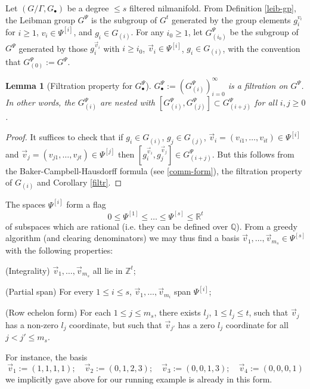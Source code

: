 \documentclass[11pt,reqno]{amsart}
\numberwithin{equation}{section}
\theoremstyle{plain}
\newtheorem{lemma}[subsection]{Lemma}
\theoremstyle{definition}
\renewcommand{\leq}{\leqslant}
\renewcommand{\geq}{\geqslant}
\newcommand\Z{\mathbb{Z}}
\newcommand\R{\mathbb{R}}
\newcommand\Q{\mathbb{Q}}
\newcommand\1{{\bf 1}}
\newcommand\2{{\bf 2}}
\begin{document}
Let $(G/\Gamma, G_\bullet)$ be a degree $\leq s$ filtered nilmanifold.
From Definition \ref{leib-gp}, the Leibman group $G^{\Psi}$ is the subgroup of $G^t$ generated by the group elements $g_i^{v_i}$ for $i \geq 1$, $v_i \in {\Psi}^{[i]}$, and $g_i \in G_{(i)}$.  For any $i_0 \geq 1$, let $G_{(i_0)}^{\Psi}$ be the subgroup of $G^{\Psi}$ generated by those $g_i^{\vec v_i}$ with $i \geq i_0$, $\vec v_i \in {\Psi}^{[i]}$, $g_i \in G_{(i)}$, with the convention that $G_{(0)}^{\Psi} := G^{\Psi}$.  

\begin{lemma}[Filtration property for $G_\bullet^\Psi$]\label{gij-lemma}
$G_\bullet^{\Psi} := (G_{(i)}^{\Psi})_{i=0}^\infty$ is a filtration on $G^{\Psi}$.   In other words, the $G_{(i)}^\Psi$ are nested with $[G_{(i)}^\Psi,G_{(j)}^\Psi] \subset G_{(i+j)}^\Psi$ for all $i, j\geq 0$.
\end{lemma}

\begin{proof} It suffices to check that if $g_i \in G_{(i)}$, $g_j \in G_{(j)}$, $\vec{v}_i = (v_{i1},\dots, v_{it}) \in \Psi^{[i]}$ and $\vec{v}_j = (v_{j1},\dots,v_{jt}) \in \Psi^{[j]}$ then $[g_i^{\vec{v}_i}, g_j^{\vec{v}_j}] \in G_{(i+j)}^{\Psi}$. But this follows from the Baker-Campbell-Hausdorff formula (see \eqref{comm-form}), the filtration property of $G_{(i)}$ and Corollary \ref{filtr}.\end{proof}

The spaces $\Psi^{[i]}$ form a flag
$$ 0 \leq \Psi^{[1]} \leq \ldots \leq \Psi^{[s]} \leq \R^t$$
of subspaces which are rational (i.e. they can be defined over $\Q$).  From a greedy algorithm (and clearing denominators) we may thus find a basis $\vec{v}_1,\ldots,\vec{v}_{m_s} \in \Psi^{[s]}$ with the following properties:

(Integrality) $\vec{v}_1,\ldots,\vec{v}_{m_s}$ all lie in $\Z^t$;

(Partial span) For every $1 \leq i \leq s$, $\vec{v}_1,\ldots,\vec{v}_{m_i}$ span $\Psi^{[i]}$;

(Row echelon form)  For each $1 \leq j \leq m_s$, there exists $l_j$, $1 \leq l_j \leq t$, such that $\vec{v}_j$ has a non-zero $l_j$ coordinate, but such that $\vec{v}_{j'}$ has a zero $l_j$ coordinate for all $j < j' \leq m_s$.

For instance, the basis 
$$ \vec v_1 := (1,1,1,1); \quad \vec v_2 := (0,1,2,3); \quad \vec v_3 := (0,0,1,3); \quad \vec v_4 := (0,0,0,1)$$
we implicitly gave above for our running example is already in this form.
\end{document}
